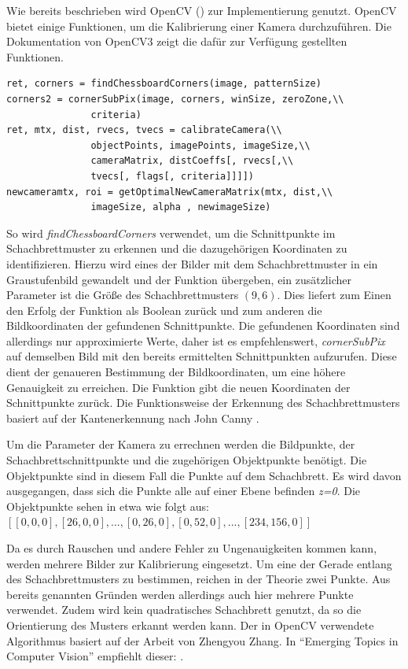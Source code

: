 Wie bereits beschrieben wird OpenCV () zur Implementierung genutzt. OpenCV bietet einige Funktionen, um die Kalibrierung einer Kamera durchzuführen. Die Dokumentation von OpenCV3 \autocite{Opencv3Camera2016} zeigt die dafür zur Verfügung gestellten Funktionen. 
\begin{lstlisting}[frame=single]
ret, corners = findChessboardCorners(image, patternSize) 
corners2 = cornerSubPix(image, corners, winSize, zeroZone,\\
               criteria) 
ret, mtx, dist, rvecs, tvecs = calibrateCamera(\\
               objectPoints, imagePoints, imageSize,\\
               cameraMatrix, distCoeffs[, rvecs[,\\
               tvecs[, flags[, criteria]]]]) 
newcameramtx, roi = getOptimalNewCameraMatrix(mtx, dist,\\
               imageSize, alpha , newimageSize)
\end{lstlisting}
So wird \textit{findChessboardCorners} verwendet, um die Schnittpunkte im Schachbrettmuster zu erkennen und die dazugehörigen Koordinaten zu identifizieren. Hierzu wird eines der Bilder mit dem Schachbrettmuster in ein Graustufenbild gewandelt und der Funktion übergeben, ein zusätzlicher Parameter ist die Größe des Schachbrettmusters $(9,6)$. Dies liefert zum Einen den Erfolg der Funktion als Boolean zurück und zum anderen die Bildkoordinaten der gefundenen Schnittpunkte. 
Die gefundenen Koordinaten sind allerdings nur approximierte Werte, daher ist es empfehlenswert, \textit{cornerSubPix} auf demselben Bild mit den bereits ermittelten Schnittpunkten aufzurufen. Diese dient der genaueren Bestimmung der Bildkoordinaten, um eine höhere Genauigkeit zu erreichen. Die Funktion gibt die neuen Koordinaten der Schnittpunkte zurück. 
Die Funktionsweise der Erkennung des Schachbrettmusters basiert auf der Kantenerkennung nach John Canny \autocite{canny1986}.

Um die Parameter der Kamera zu errechnen werden die Bildpunkte, der Schachbrettschnittpunkte und die zugehörigen Objektpunkte benötigt. Die Objektpunkte sind in diesem Fall die Punkte auf dem Schachbrett. Es wird davon ausgegangen, dass sich die Punkte alle auf einer Ebene befinden \textit{z=0}. Die Objektpunkte sehen in etwa wie folgt aus: $[[0,0,0], [26,0,0],...,[0,26,0],[0,52,0],...,[234,156,0]]$

Da es durch Rauschen und andere Fehler zu Ungenauigkeiten kommen kann, werden mehrere Bilder zur Kalibrierung eingesetzt. Um eine der Gerade entlang des Schachbrettmusters zu bestimmen, reichen in der Theorie zwei Punkte. Aus bereits genannten Gründen werden allerdings auch hier mehrere Punkte verwendet. Zudem wird kein quadratisches Schachbrett genutzt, da so die Orientierung des Musters erkannt werden kann. 
Der in OpenCV verwendete Algorithmus basiert auf der Arbeit von Zhengyou Zhang. In "`Emerging Topics in Computer Vision"' \autocite{Medioni:2004:ETC:993884} empfiehlt dieser:  \autocite[24]{Zhang2000}.

